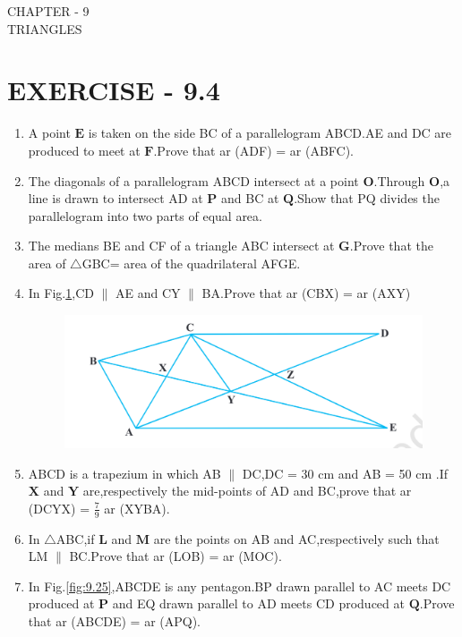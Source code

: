 \documentclass[12pt]{article}
\let\vec\mathbf
\begin{document}
\begin{center}
\textbf\large{CHAPTER - 9  \\  TRIANGLES}
\section*{EXERCISE - 9.4}
\end{center}

\begin{enumerate}

\item A point $\vec{E} $ is taken on the side BC of a parallelogram ABCD.AE and  DC are produced to meet at $\vec{F}$.Prove that  ar (ADF) = ar (ABFC).
\item The diagonals of a parallelogram ABCD intersect at a point $\vec{O}$.Through $\vec{O}$,a line is drawn to intersect AD at $\vec{P}$ and BC at $\vec{Q}$.Show that PQ divides the parallelogram into two parts of equal area.
\item The medians BE and CF of a triangle ABC intersect at $\vec{G}$.Prove that the area of $ \triangle${GBC}= area of the quadrilateral AFGE.	
\item In Fig.\ref{fig:9.24},CD $\parallel$ AE  and CY $\parallel$ BA.Prove that ar (CBX) = ar (AXY)
\begin{figure}[h]
	\centering
	\includegraphics[width=\columnwidth]{Figs/Fig9.24.png}
	\caption{}
	\label{fig:9.24}
\end{figure}
\item ABCD is a trapezium in which AB $\parallel$ DC,DC = 30 cm  and AB = 50 cm .If $\vec{X}$ and $\vec{Y}$ are,respectively the mid-points of AD and BC,prove that  ar (DCYX) = $\frac{7}{9}$ ar (XYBA).
\item  In $ \triangle${ABC},if $\vec{L}$ and $\vec{M}$ are the points on AB and AC,respectively such that LM $\parallel$ BC.Prove that ar (LOB) = ar (MOC).
\item In Fig.\ref{fig:9.25},ABCDE is any pentagon.BP drawn parallel to AC meets DC produced at $\vec{P}$ and EQ drawn parallel to AD meets CD produced at $\vec{Q}$.Prove that ar (ABCDE) = ar (APQ).

\end{enumerate}
\end{document}
